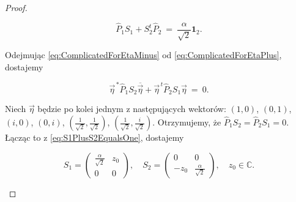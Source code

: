 {\begin{proof}
\begin{linenomath*}
 \begin{equation}
\label{eq:S1PlusS2EqualsOne}
\hat{P}_{1} S_{1} + S_{2}^{t} \hat{P}_{2} \: = \:
     \frac{\alpha}{\sqrt{2}} \mathbf{1}_{2}.
 \end{equation}
\end{linenomath*}
Odejmując \eqref{eq:ComplicatedForEtaMinus} od
\eqref{eq:ComplicatedForEtaPlus},
dostajemy
\begin{linenomath*}
 \begin{equation}
    \vec{\eta}^{\,*} \hat{P}_{1} S_{2} \overline{\vec{\eta}}
    + \vec{\eta}^{\,t} \hat{P}_{2} S_{1} \vec{\eta} \: = \: 0.
 \end{equation}
\end{linenomath*}
Niech  $\vec{\eta}$ będzie po kolei jednym z następujących wektorów:
$(1,0)$, $(0,1)$,
$(i,0)$, $(0,i)$,
$(\frac{1}{\sqrt{2}},\frac{1}{\sqrt{2}})$,
$(\frac{1}{\sqrt{2}},\frac{i}{\sqrt{2}})$.
Otrzymujemy, że $\hat{P}_{1} S_{2} = \hat{P}_{2} S_{1} = 0$.
Łącząc to z \eqref{eq:S1PlusS2EqualsOne},
dostajemy
\begin{linenomath*}
 \begin{equation}
S_{1} = \begin{pmatrix}
    \frac{\alpha}{\sqrt{2}} & z_{0} \\ 0 & 0
\end{pmatrix}, \quad
S_{2} = \begin{pmatrix}
     0 & 0 \\ - z_{0} & \frac{\alpha}{\sqrt{2}}
\end{pmatrix}, \quad
z_{0} \in \mathbb{C}.
 \end{equation}
\end{linenomath*}


\end{proof}}
